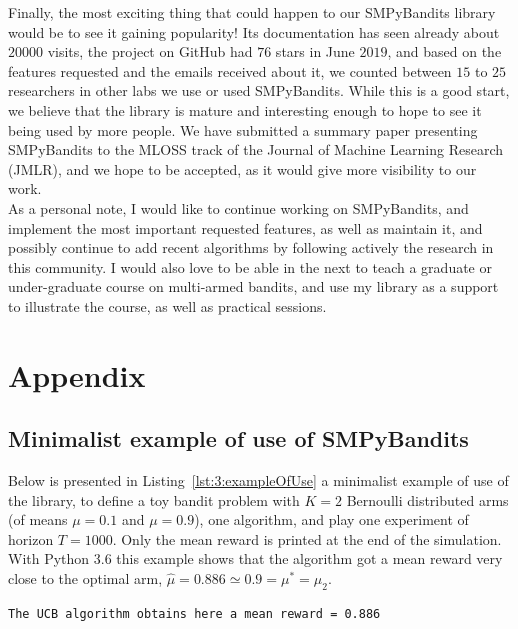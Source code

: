 Finally, the most exciting thing that could happen to our SMPyBandits library would be to see it gaining popularity!
Its documentation has seen already about $20000$ visits, the project on GitHub had $76$ stars in June $2019$, and based on the features requested and the emails received about it, we counted between $15$ to $25$ researchers in other labs we use or used SMPyBandits.
While this is a good start, we believe that the library is mature and interesting enough to hope to see it being used by more people.
%
We have submitted a summary paper presenting SMPyBandits \cite{SMPyBanditsJMLR} to the MLOSS track of the Journal of Machine Learning Research (JMLR), and we hope to be accepted, as it would give more visibility to our work.\\
%
\indent
As a personal note, I would like to continue working on SMPyBandits, and implement the most important requested features, as well as maintain it, and possibly continue to add recent algorithms by following actively the research in this community.
I would also love to be able in the next to teach a graduate or under-graduate course on multi-armed bandits, and use my library as a support to illustrate the course, as well as practical sessions.


\newpage  %
\section{Appendix}
\label{sec:3:appendix}


\subsection{Minimalist example of use of SMPyBandits}

Below is presented in Listing~\ref{lst:3:exampleOfUse} a minimalist example of use of the library, to define a toy bandit problem with $K=2$ Bernoulli distributed arms (of means $\mu=0.1$ and $\mu=0.9$), one \UCB{} algorithm, and play one experiment of horizon $T=1000$.
Only the mean reward is printed at the end of the simulation.
%
With Python 3.6 this example shows that the algorithm got a mean reward very close to the optimal arm, $\hat{\mu} = 0.886 \simeq 0.9 = \mu^* = \mu_2$.
\begin{verbatim}
The UCB algorithm obtains here a mean reward = 0.886
\end{verbatim}

\begin{small}
    \inputminted[linenos=true,numbersep=5pt,frame=lines,framesep=2mm]{python3}{2-Chapters/3-Chapter/src/example_of_use_of_SMPyBandits.py}
\end{small}


